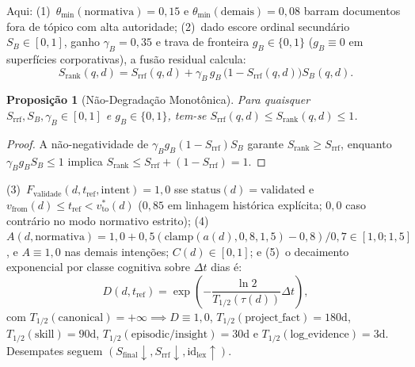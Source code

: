 \documentclass[10pt,twocolumn]{article}
\newtheorem{proposicao}{Proposi\c{c}\~ao}
\begin{document}
Aqui: (1)~$\theta_{\min}(\text{normativa}) = 0{,}15$ e $\theta_{\min}(\text{demais}) = 0{,}08$ barram documentos fora de t\'opico com alta autoridade; (2)~dado escore ordinal secund\'ario $S_B \in [0,1]$, ganho $\gamma_B = 0{,}35$ e trava de fronteira $g_B \in \{0,1\}$ ($g_B \equiv 0$ em superf\'icies corporativas), a fus\~ao residual calcula:
\begin{equation}
S_{\mathrm{rank}}(q,d) = S_{\mathrm{rrf}}(q,d) + \gamma_B \, g_B \, \bigl(1 - S_{\mathrm{rrf}}(q,d)\bigr) S_B(q,d).
\end{equation}
\begin{proposicao}[N\~ao-Degrada\c{c}\~ao Monot\^onica]
Para quaisquer $S_{\mathrm{rrf}}, S_B, \gamma_B \in [0,1]$ e $g_B \in \{0,1\}$, tem-se $S_{\mathrm{rrf}}(q,d) \le S_{\mathrm{rank}}(q,d) \le 1$.
\end{proposicao}
\begin{proof}
A n\~ao-negatividade de $\gamma_B g_B (1 - S_{\mathrm{rrf}}) S_B$ garante $S_{\mathrm{rank}} \ge S_{\mathrm{rrf}}$, enquanto $\gamma_B g_B S_B \le 1$ implica $S_{\mathrm{rank}} \le S_{\mathrm{rrf}} + (1 - S_{\mathrm{rrf}}) = 1$.
\end{proof}
(3)~$F_{\mathrm{validade}}(d, t_{\mathrm{ref}}, \mathrm{intent}) = 1{,}0$ sse $\mathrm{status}(d)=\text{validated}$ e $v_{\mathrm{from}}(d) \le t_{\mathrm{ref}} < v_{\mathrm{to}}^{*}(d)$ ($0{,}85$ em linhagem hist\'orica expl\'icita; $0{,}0$ caso contr\'ario no modo normativo estrito); (4)~$A(d, \text{normativa}) = 1{,}0 + 0{,}5(\mathrm{clamp}(a(d), 0{,}8, 1{,}5)-0{,}8)/0{,}7 \in [1{,}0; 1{,}5]$, e $A \equiv 1{,}0$ nas demais inten\c{c}\~oes; $C(d) \in [0,1]$; e (5)~o decaimento exponencial por classe cognitiva sobre $\Delta t$ dias \'e:
\begin{equation}
D(d, t_{\mathrm{ref}}) = \exp\!\left(-\frac{\ln 2}{T_{1/2}(\tau(d))} \Delta t\right),
\end{equation}
com $T_{1/2}(\text{canonical}) = +\infty \implies D \equiv 1{,}0$, $T_{1/2}(\text{project\_fact})=180\text{d}$, $T_{1/2}(\text{skill})=90\text{d}$, $T_{1/2}(\text{episodic/insight})=30\text{d}$ e $T_{1/2}(\text{log\_evidence})=3\text{d}$. Desempates seguem $(S_{\mathrm{final}} \downarrow, S_{\mathrm{rrf}} \downarrow, \mathrm{id}_{\mathrm{lex}} \uparrow)$.
\end{document}
